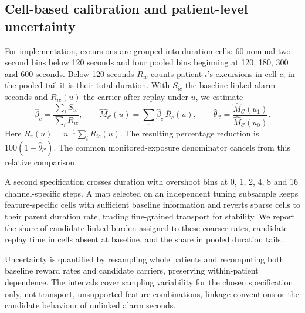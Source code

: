 \documentclass[11pt,letterpaper]{article}
\begin{document}
\subsection{Cell-based calibration and patient-level uncertainty}\label{sec:inference}

For implementation, excursions are grouped into duration cells: 60 nominal two-second bins below 120 seconds and four pooled bins beginning at 120, 180, 300 and 600 seconds. Below 120 seconds $R_{ic}$ counts patient $i$'s excursions in cell $c$; in the pooled tail it is their total duration. With $S_{ic}$ the baseline linked alarm seconds and $R_{ic}(u)$ the carrier after replay under $u$, we estimate
\begin{equation}
 \widehat\beta_c=\frac{\sum_i S_{ic}}{\sum_i R_{ic}},\qquad
 \widehat M_{\mathcal C}(u)=\sum_c\widehat\beta_c\,\overline R_c(u),\qquad
 \widehat\theta_{\mathcal C}=\frac{\widehat M_{\mathcal C}(u_1)}{\widehat M_{\mathcal C}(u_0)}.
 \label{eq:estimator}
\end{equation}
Here $\overline R_c(u)=n^{-1}\sum_iR_{ic}(u)$. The resulting percentage reduction is $100(1-\widehat\theta_{\mathcal C})$. The common monitored-exposure denominator cancels from this relative comparison.

A second specification crosses duration with overshoot bins at 0, 1, 2, 4, 8 and 16 channel-specific steps. A map selected on an independent tuning subsample keeps feature-specific cells with sufficient baseline information and reverts sparse cells to their parent duration rate, trading fine-grained transport for stability. We report the share of candidate linked burden assigned to these coarser rates, candidate replay time in cells absent at baseline, and the share in pooled duration tails.

Uncertainty is quantified by resampling whole patients and recomputing both baseline reward rates and candidate carriers, preserving within-patient dependence. The intervals cover sampling variability for the chosen specification only, not transport, unsupported feature combinations, linkage conventions or the candidate behaviour of unlinked alarm seconds.

\end{document}

